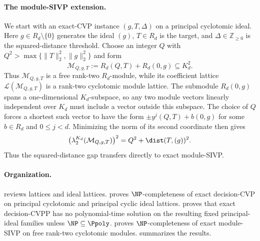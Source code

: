 \ifdefined\withModuleSIVP
\paragraph{The module-SIVP extension.}
We start with an exact-CVP instance \((g,T,\Delta)\) on a principal
cyclotomic ideal.
Here \(g\in R_d\setminus\{0\}\) generates the ideal \((g)\), \(T\in R_d\) is
the target, and \(\Delta\in\mathbb Z_{\geq0}\) is the squared-distance
threshold.  Choose an integer \(Q\) with
\(Q^2>\max\{\|T\|_2^2,\|g\|_2^2\}\) and form
\[
 \mathcal M_{Q,g,T}:=R_d(Q,T)+R_d(0,g)\subseteq K_d^2.
\]
Thus \(\mathcal M_{Q,g,T}\) is a free rank-two
\(R_d\)-module, while its coefficient lattice
\(\mathcal L(\mathcal M_{Q,g,T})\) is a rank-two cyclotomic module lattice.
The submodule \(R_d(0,g)\) spans a one-dimensional
\(K_d\)-subspace, so any two module vectors linearly independent over \(K_d\)
must include a vector outside this subspace.  The choice of \(Q\) forces a
shortest such vector to have the form \(\pm y^j(Q,T)+b(0,g)\) for some
\(b\in R_d\) and \(0\leq j<d\).
Minimizing the norm of its second coordinate then gives
\[
 \bigl(\lambda_2^{K_d}(\mathcal M_{Q,g,T})\bigr)^2
 =Q^2+\dist(T,(g))^2.
\]
Thus the squared-distance gap transfers directly to exact module-SIVP.
\fi


\paragraph{Organization.}  reviews lattices and
ideal lattices.   proves \(\NP\)-completeness of exact
decision-CVP on principal cyclotomic and principal cyclic ideal lattices.
 proves that exact decision-CVPP has no polynomial-time
solution on the resulting fixed principal-ideal families unless
\(\NP\subseteq\Ppoly\).
\ifdefined\withModuleSIVP
{} proves \(\NP\)-completeness of exact
module-SIVP on free rank-two cyclotomic modules.
\fi
{} summarizes the results.
